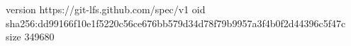 version https://git-lfs.github.com/spec/v1
oid sha256:dd99166f10e1f5220c56ce676bb579d34d78f79b9957a3f4b0f2d44396c5f47c
size 349680
